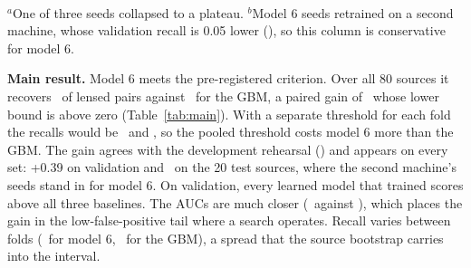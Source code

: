 \documentclass[conference]{IEEEtran}
\begin{document}
\begin{table}[t]
\caption{Recall at 1\% FPR (lensed vs repeat + impostor), S/N\,$\ge25$, 95\% source bootstrap. Validation: development
set, used to select checkpoints. Test sources: sealed until the single test run. All 80 sources: the pre-registered primary,
out-of-fold (OOF) over five source-grouped folds, final checkpoints. Empty cells were not evaluated.}
\label{tab:main}
\centering
\setlength{\tabcolsep}{2pt}
\\[2pt]
\parbox{\columnwidth}{\footnotesize $^a$One of three seeds collapsed to a plateau. $^b$Model 6 seeds retrained on a second
machine, whose validation recall is 0.05 lower (\ReproSeeds), so this column is conservative for model 6.}
\end{table}

\textbf{Main result.} Model 6 meets the pre-registered criterion. Over all 80 sources it recovers \OofSix\ of lensed pairs
against \OofGBM\ for the GBM, a paired gain of \OofDiff\ whose lower bound is above zero (Table~\ref{tab:main}). With a
separate threshold for each fold the recalls would be \OofPerFoldSix\ and \OofPerFoldGBM, so the pooled threshold costs
model 6 more than the GBM. The gain agrees with the development rehearsal (\DiffOOF) and appears on every set: +0.39 on
validation and \TbDiff\ on the 20 test sources, where the second machine's seeds stand in for model 6. On validation, every
learned model that trained scores above all three baselines. The AUCs are
much closer (\OofAucSix\ against \OofAucGBM), which places the gain in the low-false-positive tail where a search operates.
Recall varies between folds (\OofFoldRangeSix\ for model 6, \OofFoldRangeGBM\ for the GBM), a spread
that the source bootstrap carries into the interval.
\end{document}
